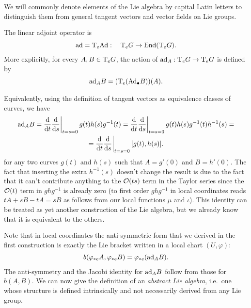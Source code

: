 We will commonly denote elements of the Lie algebra by capital Latin letters to distinguish them from general tangent vectors and vector fields on Lie groups.

\begin{defn}
    The linear adjoint operator is
    \[\mathrm{ad}=\mathrm{T}_e \mathrm{Ad}: \quad \mathrm{T}_eG\to \operatorname{End}(\mathrm{T}_eG).\]
    More explicitly, for every $A,B\in \mathrm{T}_eG$, the action of $\mathrm{ad}_A:\mathrm{T}_eG\to \mathrm{T}_eG$ is defined by
    \[\mathrm{ad}_A B=(\mathrm{T}_e(\mathrm{Ad}_\bullet B))(A).\]
\end{defn}

Equivalently, using the definition of tangent vectors as equivalence classes of curves, we have
\begin{multline}
    \ad_A B=\restr{\frac{\dd}{\dd t} \frac{\dd}{\dd s}}{t=s=0}g(t)h(s)g^{-1}(t)=\restr{\frac{\dd}{\dd t} \frac{\dd}{\dd s}}{t=s=0}g(t)h(s)g^{-1}(t)h^{-1}(s)=\\=\restr{\frac{\dd}{\dd t} \frac{\dd}{\dd s}}{t=s=0}{} [g(t),h(s)].\label{30071}
\end{multline}
for any two curves $g(t)$ and $h(s)$ such that $A=g'(0)$ and $B=h'(0)$. The fact that inserting the extra $h^{-1}(s)$ doesn't change the result is due to the fact that it can't contribute anything to the $\mathcal{O}(ts)$ term in the Taylor series since the $\mathcal{O}(t)$ term in $ghg^{-1}$ is already zero (to first order $ghg^{-1}$ in local coordinates reads $tA+sB-tA=sB$ as follows from our local functions $\mu$ and $\iota$). This identity can be treated as yet another construction of the Lie algebra, but we already know that it is equivalent to the others.

Note that in local coordinates the anti-symmetric form that we derived in the first construction is exactly the Lie bracket written in a local chart $(U,\varphi)$:
\[b(\varphi_{\ast e} A,\varphi_{\ast e} B)=\varphi_{\ast e}(\mathrm{ad}_A B).\]
The anti-symmetry and the Jacobi identity for $\mathrm{ad}_A B$ follow from those for $b(A,B)$. We can now give the definition of an \emph{abstract Lie algebra}, i.e.\ one whose structure is defined intrinsically and not necessarily derived from any Lie group.

